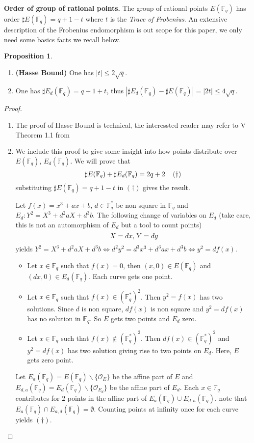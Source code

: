 \documentclass[10pt]{article}
\theoremstyle{definition}
\newtheorem{proposition}{Proposition}
\newcommand{\F}{\mathbb{F}}
\begin{document}
\noindent \textbf{Order of group of rational points.} The group of rational points $E(\F_q)$ has order $\sharp E(\F_q) = q + 1 -t$ where $t$ is the \textsl{Trace of Frobenius}.
An extensive description of the Frobenius endomorphism is out scope for this paper, we only need some basics facts we recall below.

\begin{proposition}
\begin{enumerate}
\item \textbf{(Hasse Bound)} One has $|t|  \leq 2 \sqrt{q}$.
\item One has $\sharp{} E_d(\F_q) = q+1+t$, thus $|\sharp{} E_d(\F_q) - \sharp{}E(\F_q)| = |2t|  \leq 4\sqrt{q}$.
\end{enumerate}
\end{proposition}
\begin{proof}
\begin{enumerate}
\item The proof of Hasse Bound is technical, the interessted reader may refer to V Theorem 1.1 from \cite{Silverman:EC} 
\item We include this proof to give some insight into how points distribute over $E(\F_q)$, $E_d(\F_q)$.
We will prove that 
\[  \sharp{}E(\F_q) + \sharp{}E_d(\F_q) = 2q+2 \mkern20mu (\dagger)\]
substituting $\sharp E(\F_q) = q + 1 -t$ in $(\dagger)$ gives the result.

Let $f(x) = x^3+ax+b$, $d \in \F_q^*$ be non square in $\F_q$ and $E_d : Y^2 = X^3+d^2aX+d^3b$.
The following change of variables on $E_d$ (take care, this is not an automorphism of $E_d$ but a tool to count points)
\[ X = dx, \mkern2mu Y = dy \]
yields $ Y^2 = X^3+d^2aX+d^3b \Leftrightarrow d^2y^2 = d^3x^3+d^3ax+d^3b \Leftrightarrow y^2 = df(x)$. 

\begin{itemize}
\item Let $x \in \F_q$ such that $f(x) = 0$, then $(x,0) \in E(\F_q)$ and $(dx,0) \in E_d(\F_q)$.
Each curve gets one point.
\item Let $x \in \F_q$ such that $f(x) \in (\F_q^*)^2$.
Then $y^2 = f(x)$ has two solutions.
Since $d$ is non square, $df(x)$ is non square and $y^2 = df(x)$ has no solution in $\F_q$.
So $E$ gets two points and $E_d$ zero.
\item  Let $x \in \F_q$ such that $f(x) \notin (\F_q^*)^2$.
Then $df(x) \in (\F_q^*)^2$ and $y^2 = df(x)$ has two solution giving rise to two points on $E_d$.
Here, $E$ gets zero point.
\end{itemize}
Let $E_a(\F_q) = E(\F_q) \backslash \lbrace \mathcal{O}_E \rbrace$ be the affine part of $E$ and $E_{d,a}(\F_q) = E_d(\F_q) \backslash \lbrace \mathcal{O}_{E_d} \rbrace$ be the affine part of $E_d$.
Each $x \in \F_q$ contributes for $2$ points in the affine part of $E_a(\F_q) \cup E_{d,a}(\F_q)$, note that $E_a(\F_q) \cap E_{a,d}(\F_q) =\emptyset $.
Counting points at infinity once for each curve yields $(\dagger)$.
\end{enumerate}
\end{proof}
\end{document}
